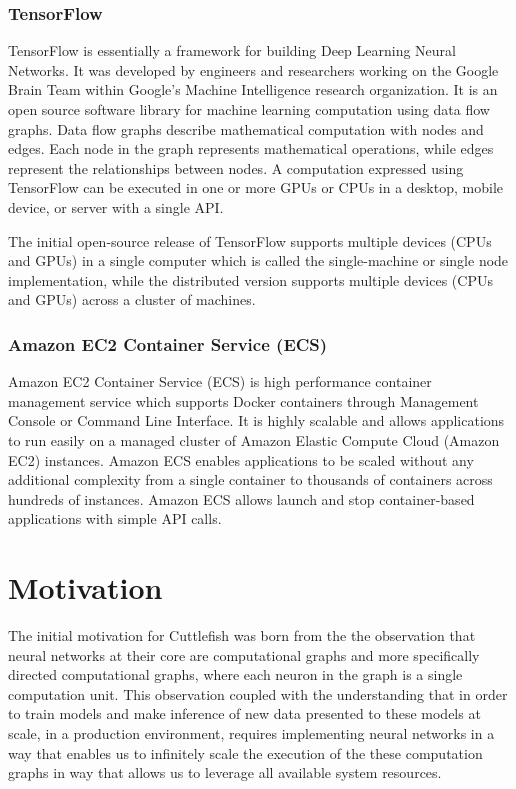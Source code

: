 \documentclass[conference]{IEEEtran}
\begin{document}
\subsubsection{TensorFlow}
TensorFlow is essentially a framework for building Deep Learning Neural Networks. It was developed by engineers and researchers working on the Google Brain Team within Google's Machine Intelligence research organization. It is an open source software library for machine learning computation using data flow graphs. Data flow graphs describe mathematical computation with nodes and edges. Each node in the graph represents mathematical operations, while edges represent the relationships between nodes. A computation expressed using TensorFlow can be executed in one or more GPUs or CPUs in a desktop, mobile device, or server with a single API.

The initial open-source release of TensorFlow supports multiple devices (CPUs and GPUs) in a single computer which is called the single-machine or single node implementation, while the distributed version supports multiple devices (CPUs and GPUs) across a cluster of machines.

\subsubsection{Amazon EC2 Container Service (ECS)}
Amazon EC2 Container Service (ECS) is high performance container management service which supports Docker containers through Management Console or Command Line Interface. It is highly scalable and allows applications to run easily on a managed cluster of Amazon Elastic Compute Cloud (Amazon EC2) instances. Amazon ECS enables applications to be scaled without any additional complexity from a single container to thousands of containers across hundreds of instances. Amazon ECS allows launch and stop container-based applications with simple API calls. 

\section{Motivation}
The initial motivation for Cuttlefish was born from the the observation that neural networks at their core are computational graphs and more specifically directed computational graphs, where each neuron in the graph is a single computation unit. This observation coupled with the understanding that in order to train models and make inference of new data presented to these models at scale, in a production environment, requires implementing neural networks in a way that enables us to infinitely scale the execution of the these computation graphs in way that allows us to leverage all available system resources.  
\end{document}

